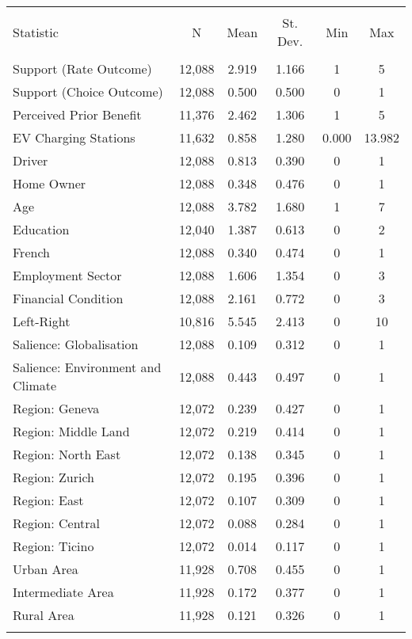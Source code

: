 
\begin{table}[!htbp] \centering 
  \caption{} 
  \label{tab:summary_stats} 
\footnotesize 
\begin{tabular}{@{\extracolsep{3pt}}lccccc} 
\\[-1.8ex]\hline 
\hline \\[-1.8ex] 
Statistic & \multicolumn{1}{c}{N} & \multicolumn{1}{c}{Mean} & \multicolumn{1}{c}{St. Dev.} & \multicolumn{1}{c}{Min} & \multicolumn{1}{c}{Max} \\ 
\hline \\[-1.8ex] 
Support (Rate Outcome) & 12,088 & 2.919 & 1.166 & 1 & 5 \\ 
Support (Choice Outcome) & 12,088 & 0.500 & 0.500 & 0 & 1 \\ 
Perceived Prior Benefit & 11,376 & 2.462 & 1.306 & 1 & 5 \\ 
EV Charging Stations & 11,632 & 0.858 & 1.280 & 0.000 & 13.982 \\ 
Driver & 12,088 & 0.813 & 0.390 & 0 & 1 \\ 
Home Owner & 12,088 & 0.348 & 0.476 & 0 & 1 \\ 
Age & 12,088 & 3.782 & 1.680 & 1 & 7 \\ 
Education & 12,040 & 1.387 & 0.613 & 0 & 2 \\ 
French & 12,088 & 0.340 & 0.474 & 0 & 1 \\ 
Employment Sector & 12,088 & 1.606 & 1.354 & 0 & 3 \\ 
Financial Condition & 12,088 & 2.161 & 0.772 & 0 & 3 \\ 
Left-Right & 10,816 & 5.545 & 2.413 & 0 & 10 \\ 
Salience: Globalisation & 12,088 & 0.109 & 0.312 & 0 & 1 \\ 
Salience: Environment and Climate & 12,088 & 0.443 & 0.497 & 0 & 1 \\ 
Region: Geneva & 12,072 & 0.239 & 0.427 & 0 & 1 \\ 
Region: Middle Land & 12,072 & 0.219 & 0.414 & 0 & 1 \\ 
Region: North East & 12,072 & 0.138 & 0.345 & 0 & 1 \\ 
Region: Zurich & 12,072 & 0.195 & 0.396 & 0 & 1 \\ 
Region: East & 12,072 & 0.107 & 0.309 & 0 & 1 \\ 
Region: Central & 12,072 & 0.088 & 0.284 & 0 & 1 \\ 
Region: Ticino & 12,072 & 0.014 & 0.117 & 0 & 1 \\ 
Urban Area & 11,928 & 0.708 & 0.455 & 0 & 1 \\ 
Intermediate Area & 11,928 & 0.172 & 0.377 & 0 & 1 \\ 
Rural Area & 11,928 & 0.121 & 0.326 & 0 & 1 \\ 
\hline \\[-1.8ex] 
\end{tabular} 
\end{table} 
